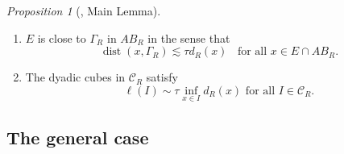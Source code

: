 \documentclass[11pt,reqno]{amsart}
\def\cC{{\mathscr{C}}}
\def\lec{\lesssim}
\def\dist{\mathop\mathrm{dist}} 						%
\theoremstyle{definition}
\theoremstyle{remark}
\numberwithin{equation}{section}
\theoremstyle{theorem}
\newtheorem{propo}[theorem]{Proposition}
\theoremstyle{definition}
\theoremstyle{remark}
\numberwithin{equation}{section}
\begin{document}
\begin{propo}[\cite{azzam2019quantitative}, Main Lemma]
\begin{enumerate}[leftmargin=0.8cm]
\begin{enumerate}[label=\textup{(}\alph*\textup{)}, leftmargin=0.8cm]
				\item $E$ is close to $\Gamma_R$ in $AB_{R}$ in the sense that
				\begin{equation}
				\label{e:adr-corona}
				\dist(x,\Gamma_R)\lec  \tau d_{R}(x) \;\; \mbox{ for all }x\in E\cap AB_{R}.
				\end{equation}
				\item The dyadic cubes in $\cC_R$ satisfy
				\begin{equation}
				\label{e:whitney-like}
				\ell(I)\sim \tau \inf_{x\in I} d_{R}(x) \mbox{ for all }I\in \cC_R.
				\end{equation}
			\end{enumerate}
		\end{enumerate}
	\end{propo}


\vspace{0.5cm}

\subsection{The general case}
\end{document}
